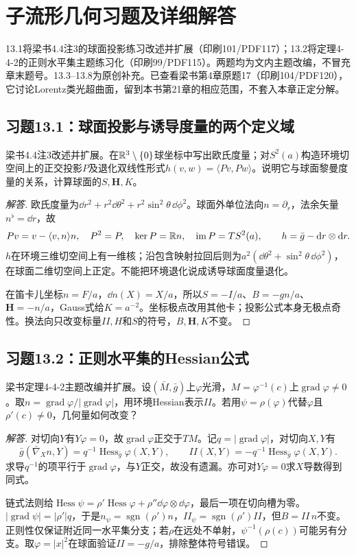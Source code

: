 \section{子流形几何习题及详细解答}
13.1将梁书4.4注3的球面投影练习改述并扩展（印刷101/PDF117）；13.2将定理4-4-2的正则水平集主题练习化（印刷99/PDF115）。两题均为文内主题改编，不冒充章末题号。13.3--13.8为原创补充。已查看梁书第4章原题17（印刷104/PDF120），它讨论Lorentz类光超曲面，留到本书第21章的相应范围，不套入本章正定分解。

\subsection*{习题13.1：球面投影与诱导度量的两个定义域}
梁书4.4注3改述并扩展。在$\mathbb{R}^3\setminus\{0\}$球坐标中写出欧氏度量；对$S^2(a)$构造环境切空间上的正交投影$P$及退化双线性形式$h(v,w)=\langle Pv,Pw\rangle$。说明它与球面黎曼度量的关系，计算球面的$S,\mathbf H,K$。
\begin{proof}[解答]
欧氏度量为$\dd r^2+r^2\dd\theta^2+r^2\sin^2\theta\,\dd\phi^2$。球面外单位法向$n=\partial_r$，法余矢量$n^\flat=\dd r$，故
\[
 Pv=v-\langle v,n\rangle n,\quad
 P^2=P,\quad\ker P=\mathbb{R} n,\quad\operatorname{im}P=TS^2(a),
 \qquad h=\bar g-\mathrm{d} r\otimes\mathrm{d} r.
\]
$h$在环境三维切空间上有一维核；沿包含映射拉回后则为$a^2(\dd\theta^2+\sin^2\theta\,\dd\phi^2)$，在球面二维切空间上正定。不能把环境退化说成诱导球面度量退化。

在笛卡儿坐标$n=F/a$，$\dd n(X)=X/a$，所以$S=-I/a$、$B=-gn/a$、$\mathbf H=-n/a$，Gauss式给$K=a^{-2}$。坐标极点改用其他卡；投影公式本身无极点奇性。换法向只改变标量$II,H$和$S$的符号，$B,\mathbf H,K$不变。
\end{proof}

\subsection*{习题13.2：正则水平集的Hessian公式}
梁书定理4-4-2主题改编并扩展。设$(\bar M,\bar g)$上$\varphi$光滑，$M=\varphi^{-1}(c)$上$\operatorname{grad}\varphi\ne0$。取$n=\operatorname{grad}\varphi/|\operatorname{grad}\varphi|$，用环境Hessian表示$II$。若用$\psi=\rho(\varphi)$代替$\varphi$且$\rho'(c)\ne0$，几何量如何改变？
\begin{proof}[解答]
对切向$Y$有$Y\varphi=0$，故$\operatorname{grad}\varphi$正交于$TM$。记$q=|\operatorname{grad}\varphi|$，对切向$X,Y$有
\[
 \bar g(\bar\nabla_Xn,Y)=q^{-1}\operatorname{Hess}_{\bar g}\varphi(X,Y),
 \qquad II(X,Y)=-q^{-1}\operatorname{Hess}_{\bar g}\varphi(X,Y).
\]
求导$q^{-1}$的项平行于$\operatorname{grad}\varphi$，与$Y$正交，故没有遗漏。亦可对$Y\varphi=0$求$X$导数得到同式。

链式法则给$\operatorname{Hess}\psi=\rho'\operatorname{Hess}\varphi+\rho''\dd\varphi\otimes\dd\varphi$，最后一项在切向槽为零。$|\operatorname{grad}\psi|=|\rho'|q$，于是$n_\psi=\operatorname{sgn}(\rho')n$，$II_\psi=\operatorname{sgn}(\rho')II$，但$B=II\,n$不变。正则性仅保证附近同一水平集分支；若$\rho$在远处不单射，$\psi^{-1}(\rho(c))$可能另有分支。取$\varphi=|x|^2$在球面验证$II=-g/a$，排除整体符号错误。
\end{proof}

